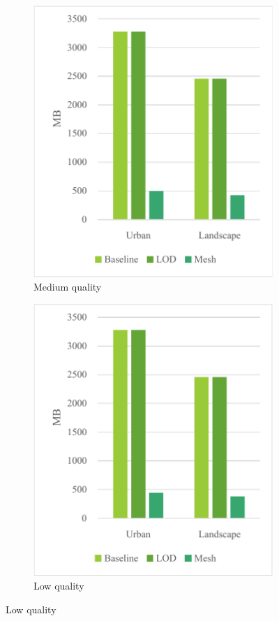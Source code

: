 \begin{figure}[h]
\begin{subfigure}{0.3\textwidth}
        \includegraphics[width=\textwidth]{graph-mem-med.pdf}
        \caption{Medium quality}
    \end{subfigure}
    \begin{subfigure}{0.3\textwidth}
        \centering
        \includegraphics[width=\textwidth]{graph-mem-low.pdf}
        \caption{Low quality}
    \end{subfigure}
    

\end{figure}
